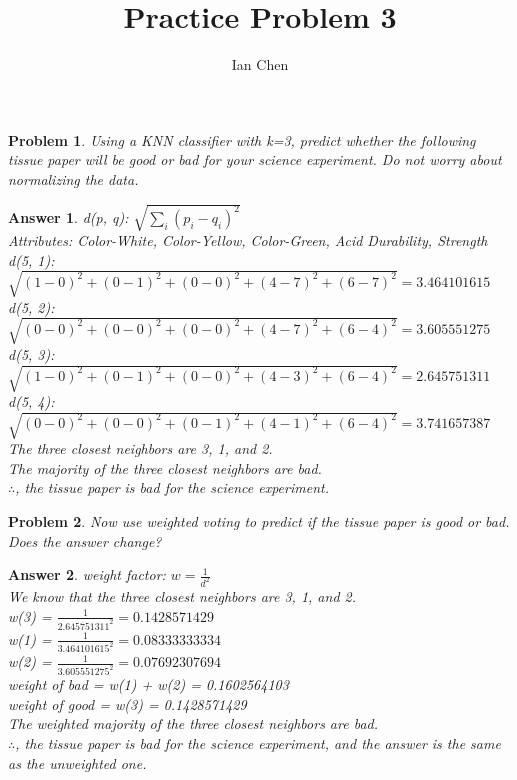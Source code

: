 \documentclass[11pt]{article}
\author{Ian Chen}
\title{Practice Problem 3}
\theoremstyle{description}
\newtheorem{problem}{Problem}
\theoremstyle{break}
\newtheorem*{answer}{Answer}
\begin{document}
    \maketitle

    \begin{problem}
        Using a KNN classifier with k=3, predict whether the following tissue paper will be good or bad for your science experiment.
        \textit{Do not worry about normalizing the data.}
    \end{problem}
    \begin{answer}
        d(p, q): $\sqrt{\sum_{i}(p_i - q_i)^2}$\\
        Attributes: Color-White, Color-Yellow, Color-Green, Acid Durability, Strength\\
        d(5, 1): $\sqrt{(1 - 0)^2 + (0 - 1)^2 + (0 - 0)^2 + (4 - 7)^2 + (6 - 7)^2} = 3.464101615$\\
        d(5, 2): $\sqrt{(0 - 0)^2 + (0 - 0)^2 + (0 - 0)^2 + (4 - 7)^2 + (6 - 4)^2} = 3.605551275$\\
        d(5, 3): $\sqrt{(1 - 0)^2 + (0 - 1)^2 + (0 - 0)^2 + (4 - 3)^2 + (6 - 4)^2} = 2.645751311$\\
        d(5, 4): $\sqrt{(0 - 0)^2 + (0 - 0)^2 + (0 - 1)^2 + (4 - 1)^2 + (6 - 4)^2} = 3.741657387$\\
        The three closest neighbors are 3, 1, and 2.\\
        The majority of the three closest neighbors are bad.\\
        $\therefore$, the tissue paper is bad for the science experiment.
    \end{answer}

    \begin{problem}
        Now use weighted voting to predict if the tissue paper is good or bad.
        Does the answer change?
    \end{problem}
    \begin{answer}
        weight factor: $w = \frac{1}{d^2}$\\
        We know that the three closest neighbors are 3, 1, and 2.\\
        w(3) = $\frac{1}{2.645751311^2} = 0.1428571429$\\
        w(1) = $\frac{1}{3.464101615^2} = 0.08333333334$\\
        w(2) = $\frac{1}{3.605551275^2} = 0.07692307694$\\
        weight of bad = w(1) + w(2) = 0.1602564103\\
        weight of good = w(3) = 0.1428571429\\
        The weighted majority of the three closest neighbors are bad.\\
        $\therefore$, the tissue paper is bad for the science experiment, and the answer is the
        same as the unweighted one.
    \end{answer}
\end{document}
